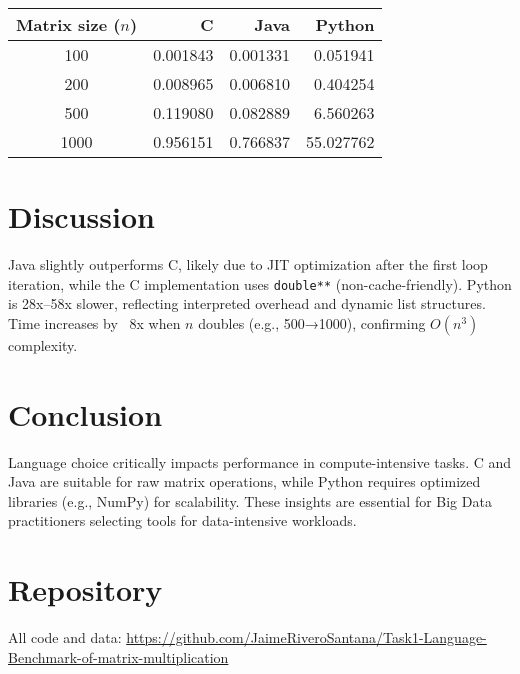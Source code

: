 \documentclass[12pt]{article}
\begin{document}
\begin{center}
\begin{tabular}{crrr}
\toprule
Matrix size ($n$) & C & Java & Python \\
\midrule
100 & 0.001843 & 0.001331 & 0.051941 \\
200 & 0.008965 & 0.006810 & 0.404254 \\
500 & 0.119080 & 0.082889 & 6.560263 \\
1000 & 0.956151 & 0.766837 & 55.027762 \\
\bottomrule
\end{tabular}
\end{center}

\section{Discussion}
Java slightly outperforms C, likely due to JIT optimization after the first loop iteration, while the C implementation uses \texttt{double**} (non-cache-friendly). Python is 28x–58x slower, reflecting interpreted overhead and dynamic list structures. Time increases by ~8x when $n$ doubles (e.g., 500→1000), confirming $O(n^3)$ complexity.

\section{Conclusion}
Language choice critically impacts performance in compute-intensive tasks. C and Java are suitable for raw matrix operations, while Python requires optimized libraries (e.g., NumPy) for scalability. These insights are essential for Big Data practitioners selecting tools for data-intensive workloads.

\section*{Repository}
All code and data: \url{https://github.com/JaimeRiveroSantana/Task1-Language-Benchmark-of-matrix-multiplication}
\end{document}
